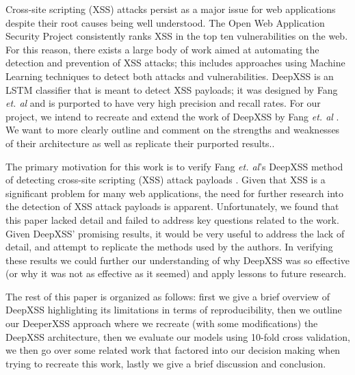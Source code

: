 Cross-site scripting (XSS) attacks persist as a major issue for web applications despite their root causes being well understood. The Open Web Application Security Project consistently ranks XSS in the top ten vulnerabilities on the web. For this reason, there exists a large body of work aimed at automating the detection and prevention of XSS attacks; this includes approaches using Machine Learning techniques to detect both attacks and vulnerabilities. DeepXSS is an LSTM classifier that is meant to detect XSS payloads; it was designed by Fang \textit{et. al} and is purported to have very high precision and recall rates. For our project, we intend to recreate and extend the work of DeepXSS by Fang \textit{et. al} \cite{fang2018deepxss}. We want to more clearly outline and comment on the strengths and weaknesses of their architecture as well as replicate their purported results.\cite{fang2018deepxss}. 

The primary motivation for this work is to verify Fang \textit{et. al}'s DeepXSS method of detecting cross-site scripting (XSS) attack payloads \cite{fang2018deepxss}. Given that XSS is a significant problem for many web applications, the need for further research into the detection of XSS attack payloads is apparent.  Unfortunately, we found that this paper lacked detail and failed to address key questions related to the work.  Given DeepXSS' promising results, it would be very useful to address the lack of detail, and attempt to replicate the methods used by the authors.  In verifying these results we could further our understanding of why DeepXSS was so effective (or why it was not as effective as it seemed) and apply lessons to future research.

The rest of this paper is organized as follows: first we give a brief overview of DeepXSS highlighting its limitations in terms of reproducibility, then we outline our DeeperXSS approach where we recreate (with some modifications) the DeepXSS architecture, then we evaluate our models using 10-fold cross validation, we then go over some related work that factored into our decision making when trying to recreate this work, lastly we give a brief discussion and conclusion.